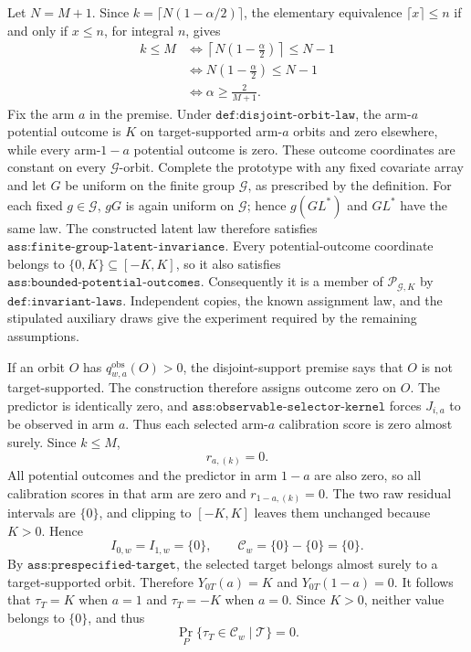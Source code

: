 Let \(N=M+1\). Since \(k=\lceil N(1-\alpha/2)\rceil\), the elementary equivalence \(\lceil x\rceil\le n\) if and only if \(x\le n\), for integral \(n\), gives
\[
\begin{aligned}
k\le M
&\iff \left\lceil N\left(1-\frac{\alpha}{2}\right)\right\rceil\le N-1\\
&\iff N\left(1-\frac{\alpha}{2}\right)\le N-1\\
&\iff \alpha\ge\frac{2}{M+1}.
\end{aligned}
\]
Fix the arm \(a\) in the premise. Under \(\texttt{def:disjoint-orbit-law}\), the arm-\(a\) potential outcome is \(K\) on target-supported arm-\(a\) orbits and zero elsewhere, while every arm-\(1-a\) potential outcome is zero. These outcome coordinates are constant on every \(\mathcal G\)-orbit. Complete the prototype with any fixed covariate array and let \(G\) be uniform on the finite group \(\mathcal G\), as prescribed by the definition. For each fixed \(g\in\mathcal G\), \(gG\) is again uniform on \(\mathcal G\); hence \(g(GL^*)\) and \(GL^*\) have the same law. The constructed latent law therefore satisfies \(\texttt{ass:finite-group-latent-invariance}\). Every potential-outcome coordinate belongs to \(\{0,K\}\subseteq[-K,K]\), so it also satisfies \(\texttt{ass:bounded-potential-outcomes}\). Consequently it is a member of \(\mathcal P_{\mathcal G,K}\) by \(\texttt{def:invariant-laws}\). Independent copies, the known assignment law, and the stipulated auxiliary draws give the experiment required by the remaining assumptions.

If an orbit \(O\) has \(q^{\mathrm{obs}}_{w,a}(O)>0\), the disjoint-support premise says that \(O\) is not target-supported. The construction therefore assigns outcome zero on \(O\). The predictor is identically zero, and \(\texttt{ass:observable-selector-kernel}\) forces \(J_{i,a}\) to be observed in arm \(a\). Thus each selected arm-\(a\) calibration score is zero almost surely. Since \(k\le M\),
\[
r_{a,(k)}=0.
\]
All potential outcomes and the predictor in arm \(1-a\) are also zero, so all calibration scores in that arm are zero and \(r_{1-a,(k)}=0\). The two raw residual intervals are \(\{0\}\), and clipping to \([-K,K]\) leaves them unchanged because \(K>0\). Hence
\[
I_{0,w}=I_{1,w}=\{0\},\qquad \mathcal C_w=\{0\}-\{0\}=\{0\}.
\]
By \(\texttt{ass:prespecified-target}\), the selected target belongs almost surely to a target-supported orbit. Therefore \(Y_{0T}(a)=K\) and \(Y_{0T}(1-a)=0\). It follows that \(\tau_T=K\) when \(a=1\) and \(\tau_T=-K\) when \(a=0\). Since \(K>0\), neither value belongs to \(\{0\}\), and thus
\[
\Pr_P\{\tau_T\in\mathcal C_w\mid\mathcal T\}=0.
\]